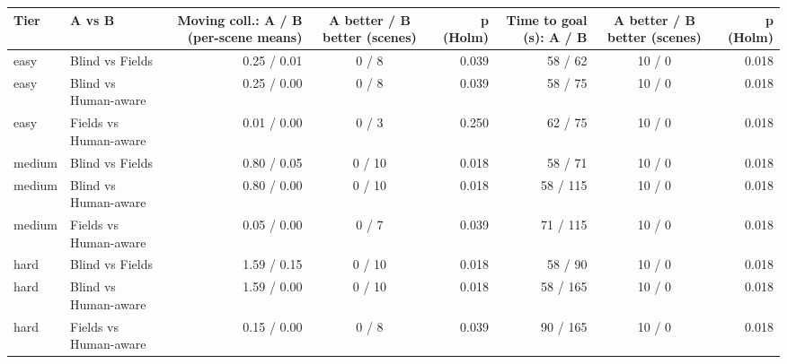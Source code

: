 \begin{tabular}{llrcrrcr}
\toprule
Tier & A vs B & Moving coll.: A / B (per-scene means) & A better / B better (scenes) & p (Holm) & Time to goal (s): A / B & A better / B better (scenes) & p (Holm) \\
\midrule
easy & Blind vs Fields & 0.25 / 0.01 & 0 / 8 & 0.039 & 58 / 62 & 10 / 0 & 0.018 \\
easy & Blind vs Human-aware & 0.25 / 0.00 & 0 / 8 & 0.039 & 58 / 75 & 10 / 0 & 0.018 \\
easy & Fields vs Human-aware & 0.01 / 0.00 & 0 / 3 & 0.250 & 62 / 75 & 10 / 0 & 0.018 \\
medium & Blind vs Fields & 0.80 / 0.05 & 0 / 10 & 0.018 & 58 / 71 & 10 / 0 & 0.018 \\
medium & Blind vs Human-aware & 0.80 / 0.00 & 0 / 10 & 0.018 & 58 / 115 & 10 / 0 & 0.018 \\
medium & Fields vs Human-aware & 0.05 / 0.00 & 0 / 7 & 0.039 & 71 / 115 & 10 / 0 & 0.018 \\
hard & Blind vs Fields & 1.59 / 0.15 & 0 / 10 & 0.018 & 58 / 90 & 10 / 0 & 0.018 \\
hard & Blind vs Human-aware & 1.59 / 0.00 & 0 / 10 & 0.018 & 58 / 165 & 10 / 0 & 0.018 \\
hard & Fields vs Human-aware & 0.15 / 0.00 & 0 / 8 & 0.039 & 90 / 165 & 10 / 0 & 0.018 \\
\bottomrule
\end{tabular}
